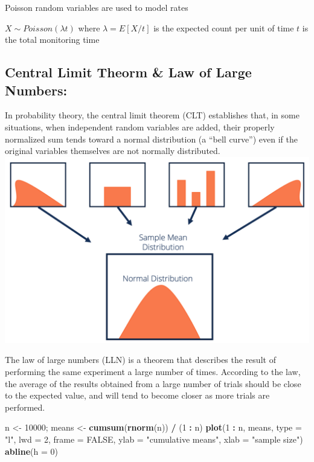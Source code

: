 \documentclass[]{article}
\newenvironment{Shaded}{\begin{snugshade}}{\end{snugshade}}
\newcommand{\DataTypeTok}[1]{\textcolor[rgb]{0.13,0.29,0.53}{#1}}
\newcommand{\DecValTok}[1]{\textcolor[rgb]{0.00,0.00,0.81}{#1}}
\newcommand{\KeywordTok}[1]{\textcolor[rgb]{0.13,0.29,0.53}{\textbf{#1}}}
\newcommand{\NormalTok}[1]{#1}
\newcommand{\OperatorTok}[1]{\textcolor[rgb]{0.81,0.36,0.00}{\textbf{#1}}}
\newcommand{\OtherTok}[1]{\textcolor[rgb]{0.56,0.35,0.01}{#1}}
\newcommand{\StringTok}[1]{\textcolor[rgb]{0.31,0.60,0.02}{#1}}
\begin{document}
Poisson random variables are used to model rates

\(X \sim Poisson(\lambda t)\) where \(\lambda = E[X / t]\) is the
expected count per unit of time \(t\) is the total monitoring time

\hypertarget{central-limit-theorm-law-of-large-numbers}{%
\subsection{Central Limit Theorm \& Law of Large
Numbers:}\label{central-limit-theorm-law-of-large-numbers}}

In probability theory, the central limit theorem (CLT) establishes that,
in some situations, when independent random variables are added, their
properly normalized sum tends toward a normal distribution (a ``bell
curve'') even if the original variables themselves are not normally
distributed. \includegraphics{CLt.png}

The law of large numbers (LLN) is a theorem that describes the result of
performing the same experiment a large number of times. According to the
law, the average of the results obtained from a large number of trials
should be close to the expected value, and will tend to become closer as
more trials are performed.

\begin{Shaded}
\begin{Highlighting}[]
\NormalTok{n <-}\StringTok{ }\DecValTok{10000}\NormalTok{; means <-}\StringTok{ }\KeywordTok{cumsum}\NormalTok{(}\KeywordTok{rnorm}\NormalTok{(n)) }\OperatorTok{/}\StringTok{ }\NormalTok{(}\DecValTok{1}  \OperatorTok{:}\StringTok{ }\NormalTok{n)}
\KeywordTok{plot}\NormalTok{(}\DecValTok{1} \OperatorTok{:}\StringTok{ }\NormalTok{n, means, }\DataTypeTok{type =} \StringTok{"l"}\NormalTok{, }\DataTypeTok{lwd =} \DecValTok{2}\NormalTok{, }\DataTypeTok{frame =} \OtherTok{FALSE}\NormalTok{, }\DataTypeTok{ylab =} \StringTok{"cumulative means"}\NormalTok{, }\DataTypeTok{xlab =} \StringTok{"sample size"}\NormalTok{)}
\KeywordTok{abline}\NormalTok{(}\DataTypeTok{h =} \DecValTok{0}\NormalTok{)}
\end{Highlighting}
\end{Shaded}
\end{document}
